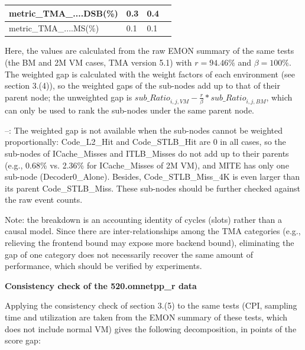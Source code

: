 \documentclass[12pt]{article}
\newcommand{\npar}[1]{#1\par}
\newcommand{\emptypar}{\mbox{}\par}
\begin{document}
\begin{longtable}{|b{204.20pt}|b{89.20pt}|b{89.20pt}|@{}b{0pt}@{}}
\raggedright\arraybackslash{}metric\_\allowbreak{}TMA\_\allowbreak{}....DSB(\%) & \centering\arraybackslash{}0.3 & \centering\arraybackslash{}0.4 & \rule[-0.00pt]{0pt}{11.65pt} \\ \hline
\raggedright\arraybackslash{}metric\_\allowbreak{}TMA\_\allowbreak{}....MS(\%) & \centering\arraybackslash{}0.1 & \centering\arraybackslash{}0.1 & \rule[-0.00pt]{0pt}{11.65pt} \\ \hline
\end{longtable}
\endgroup\par
\npar{\hspace*{9.60pt}Here, the values are calculated from the raw EMON summary of the same tests (the BM and 2M VM cases, TMA version 5.1) with $\mathit{r}=94.46\%$ and $\beta =100\%$. The weighted gap is calculated with the weight factors of each environment (see section 3.(4)), so the weighted gaps of the sub-nodes add up to that of their parent node; the unweighted gap is ${\mathit{sub\_Ratio}}_{\mathit{i},\mathit{j},\mathit{VM}}-\frac{\mathit{r}}{\beta }*{\mathit{sub\_Ratio}}_{\mathit{i},\mathit{j},\mathit{BM}}$, which can only be used to rank the sub-nodes under the same parent node.}
\npar{\hspace*{9.60pt}–: The weighted gap is not available when the sub-nodes cannot be weighted proportionally: Code\_L2\_Hit and Code\_STLB\_Hit are 0 in all cases, so the sub-nodes of ICache\_Misses and ITLB\_Misses do not add up to their parents (e.g., 0.68\% vs. 2.36\% for ICache\_Misses of 2M VM), and MITE has only one sub-node (Decoder0\_Alone). Besides, Code\_STLB\_Miss\_4K is even larger than its parent Code\_STLB\_Miss. These sub-nodes should be further checked against the raw event counts.}
\npar{\hspace*{9.60pt}Note: the breakdown is an accounting identity of cycles (slots) rather than a causal model. Since there are inter-relationships among the TMA categories (e.g., relieving the frontend bound may expose more backend bound), eliminating the gap of one category does not necessarily recover the same amount of performance, which should be verified by experiments.}
\emptypar
\npar{\hspace*{9.75pt}\textbf{Consistency check of the 520.omnetpp\_r data}}
\npar{\hspace*{9.75pt}Applying the consistency check of section 3.(5) to the same tests (CPI, sampling time and utilization are taken from the EMON summary of these tests, which does not include normal VM) gives the following decomposition, in points of the score gap:}
\end{document}

